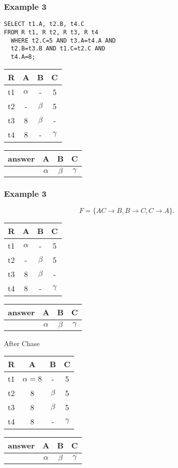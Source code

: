 \documentclass{beamer}
\begin{document}
\begin{frame}[fragile]
  \frametitle{Example 3}
    \begin{verbatim}
SELECT t1.A, t2.B, t4.C
FROM R t1, R t2, R t3, R t4
  WHERE t2.C=5 AND t3.A=t4.A AND
  t2.B=t3.B AND t1.C=t2.C AND
  t4.A=8;
\end{verbatim}
  \begin{tabular}{ c | c c c}
  R & A & B & C \\
  \hline
  t1 & $\alpha$ & -  & 5 \\
  t2 & -  & $\beta$  & 5 \\
  t3 & 8  & $\beta$ & - \\
  t4 & 8  & - & $\gamma$ \\
  \end{tabular}
  \begin{tabular}{ c | c c c}
  answer & A & B & C \\
  \hline
   & $\alpha$& $\beta$& $\gamma$\\
  \end{tabular}
   
\end{frame}

\begin{frame}
  \frametitle{Example 3}
  $$
  F=\{AC\rightarrow B, B\rightarrow C, C \rightarrow A\}.
  $$
  
    \begin{tabular}{ c | c c c}
  R & A & B & C \\
  \hline
  t1 & $\alpha$ & -  & 5 \\
  t2 & -  & $\beta$  & 5 \\
  t3 & 8  & $\beta$ & - \\
  t4 & 8  & - & $\gamma$ \\
  \end{tabular}
  \begin{tabular}{ c | c c c}
  answer & A & B & C \\
  \hline
   & $\alpha$& $\beta$& $\gamma$\\
  \end{tabular}
  
  After Chase
  
  \begin{tabular}{ c | c c c}
  R & A & B & C \\
  \hline
  t1 & $\alpha=8$ & -  & 5 \\
  t2 & 8  & $\beta$  & 5 \\
  t3 & 8  & $\beta$ & 5 \\
  t4 & 8  & - & $\gamma$ \\
  \end{tabular}
  \begin{tabular}{ c | c c c}
  answer & A & B & C \\
  \hline
   & $\alpha$& $\beta$& $\gamma$\\
  \end{tabular}
\end{frame}
\end{document}
